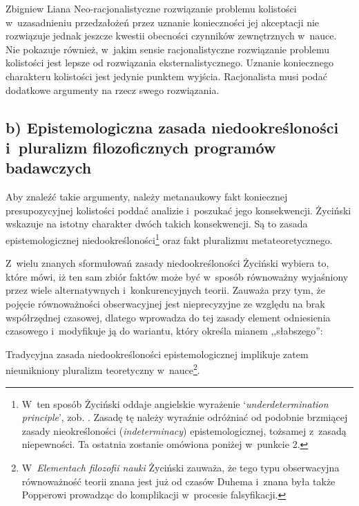 \begin{artplenv}{Zbigniew Liana}
Neo-racjonalistyczne rozwiązanie problemu kolistości w~uzasadnieniu przedzałożeń przez uznanie konieczności jej akceptacji nie rozwiązuje jednak jeszcze kwestii obecności czynników zewnętrznych w~nauce. Nie pokazuje również, w~jakim sensie racjonalistyczne rozwiązanie problemu kolistości jest lepsze od rozwiązania eksternalistycznego. Uznanie koniecznego charakteru kolistości jest jedynie punktem wyjścia. Racjonalista musi podać dodatkowe argumenty na rzecz swego rozwiązania.

\subsection{b) Epistemologiczna zasada niedookreśloności i~pluralizm filozoficznych programów badawczych}

Aby znaleźć takie argumenty, należy metanaukowy fakt koniecznej presupozycyjnej kolistości poddać analizie i~poszukać jego konsekwencji. Życiński wskazuje na istotny charakter dwóch takich konsekwencji. Są to zasada epistemologicznej niedookreśloności\footnote{W~ten sposób Życiński oddaje angielskie wyrażenie `\textit{underdetermination principle}', zob.
\parencite[][s.~129n]{zycinski_teizm_1985}. %
 Zasadę tę należy wyraźnie odróżniać od podobnie brzmiącej zasady nieokreśloności (\textit{indeterminacy}) epistemologicznej, tożsamej z~zasadą niepewności. Ta ostatnia zostanie omówiona poniżej w~punkcie 2.} oraz fakt pluralizmu metateoretycznego.

Z~wielu znanych sformułowań zasady niedookreśloności Życiński wybiera to, które mówi, iż ten sam zbiór faktów może być w~sposób równoważny wyjaśniony przez wiele alternatywnych i~konkurencyjnych teorii. Zauważa przy tym, że pojęcie równoważności obserwacyjnej jest nieprecyzyjne ze względu na brak współrzędnej czasowej, dlatego wprowadza do tej zasady element odniesienia czasowego i~modyfikuje ją do wariantu, który określa mianem ,,słabszego'':

Tradycyjna zasada niedookreśloności epistemologicznej implikuje zatem nieunikniony pluralizm teoretyczny w~nauce\footnote{W~\textit{Elementach filozofii nauki}
\parencites[][s.~106n]{zycinski_elementy_1996}[][s.~143]{zycinski_elementy_2015} %
 Życiński zauważa, że tego typu obserwacyjna równoważność teorii znana jest już od czasów Duhema i~znana była także Popperowi prowadząc do komplikacji w~procesie falsyfikacji.}.


\end{artplenv}
